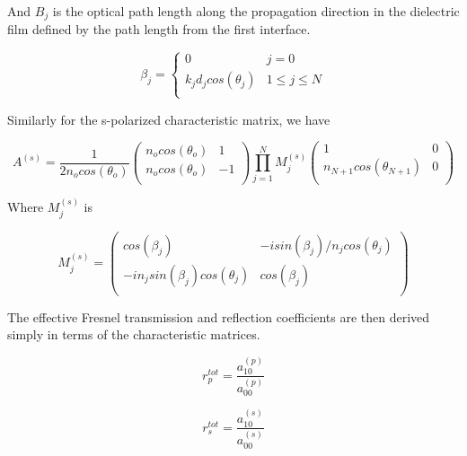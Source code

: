 And $B_{j}$ is the optical path length along the propagation direction in the dielectric film defined by the path length from the first interface.

\begin{equation}
    \beta_{j} = 
    \begin{cases}
        0 & j = 0 \\
        k_{j}d_{j}cos(\theta_{j}) & 1 \leq j \leq N \\
    \end{cases}
\end{equation}

Similarly for the s-polarized characteristic matrix, we have

\begin{equation}
    A^{(s)} = \frac{1}{2n_{o}cos(\theta_{o})}
    \begin{pmatrix}
        n_{o}cos(\theta_{o}) & 1 \\
        n_{o}cos(\theta_{o}) & -1 \\
    \end{pmatrix}
    \prod_{j=1}^{N} M_{j}^{(s)}
    \begin{pmatrix}
        1 & 0 \\
        n_{N+1}cos(\theta_{N+1}) & 0 \\
    \end{pmatrix}
\end{equation}

Where $M_{j}^{(s)}$ is

\begin{equation}
    M_{j}^{(s)} = 
    \begin{pmatrix}
        cos(\beta_{j}) & -isin(\beta_{j})/n_{j}cos(\theta_{j}) \\
        -in_{j}sin(\beta_{j})cos(\theta_{j}) &  cos(\beta_{j})  \\
    \end{pmatrix}
\end{equation}

The effective Fresnel transmission and reflection coefficients are then derived simply in terms of the characteristic matrices.

\begin{equation}
    r_{p}^{tot} = \frac{a_{10}^{(p)}}{a_{00}^{(p)}}
\end{equation}

\begin{equation}
    r_{s}^{tot} = \frac{a_{10}^{(s)}}{a_{00}^{(s)}}
\end{equation}

